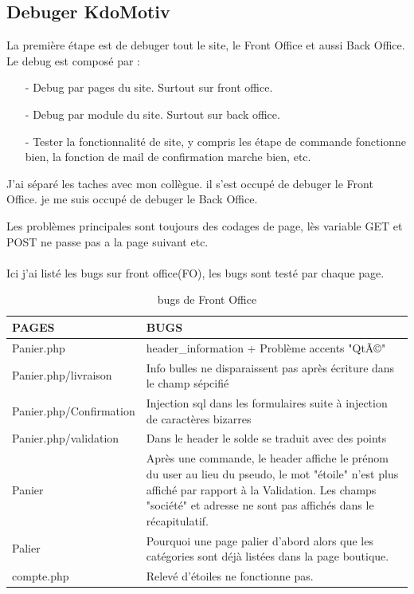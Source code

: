 \subsection{Debuger KdoMotiv}
La première étape est de debuger tout le site, le Front Office  et aussi Back Office. 
Le debug est composé par :
\begin{itemize}
\item [-] Debug par pages du site. Surtout sur front office.
\item [-] Debug par module du site. Surtout sur back office.
\item [-] Tester la fonctionnalité de site, y compris les étape de commande fonctionne bien, la fonction de mail de confirmation marche bien, etc.
\end{itemize}

J'ai séparé les taches avec mon collègue. il s'est occupé de debuger le Front Office. je me suis occupé de debuger le Back Office.

Les problèmes principales sont toujours des codages de page, lès variable GET et POST ne passe pas a la page suivant etc.


\paragraph{}
Ici j'ai listé les bugs sur front office(FO), les bugs sont testé par chaque page. 

\begin{table}[htbp]
\renewcommand{\tabularxcolumn}[1]{>{\arraybackslash}m{#1}}
\begin{tabularx}{\textwidth}{lX}
\hline 
PAGES
 & BUGS
 \\ 
\hline 
Panier.php
 & header\_information + Problème accents "QtÃ©"
 \\ 
\hline 
Panier.php/livraison
 & Info bulles ne disparaissent pas après écriture dans le champ sépcifié
 \\ 
\hline 
Panier.php/Confirmation
 & Injection sql dans les formulaires suite à injection de caractères bizarres
 \\ 
\hline 
Panier.php/validation
 & Dans le header le solde se traduit avec des points
 \\ 
\hline 
Panier
 & Après une commande, le header affiche le prénom du user au lieu du pseudo, le mot "étoile" n'est plus affiché par rapport à la Validation. Les champs "société" et adresse ne sont pas affichés dans le récapitulatif.
 \\ 
\hline 
Palier
 & Pourquoi une page palier  d'abord alors que les catégories sont déjà listées dans la page boutique.
 \\ 
\hline 
compte.php
 & Relevé d'étoiles ne fonctionne pas.
 \\ 
\hline 
\end{tabularx} 
 \caption{bugs de Front Office}
\end{table}

